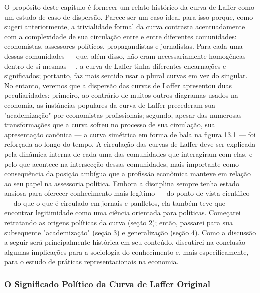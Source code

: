\documentclass[a4paper,12pt]{article}[abntex2]
\begin{document}
O propósito deste capítulo é fornecer um relato histórico da curva de Laffer como um estudo de caso de dispersão. Parece ser um caso ideal para isso porque, como sugeri anteriormente, a trivialidade formal da curva contrasta acentuadamente com a complexidade de sua circulação entre e entre diferentes comunidades: economistas, assessores políticos, propagandistas e jornalistas. Para cada uma dessas comunidades — que, além disso, não eram necessariamente homogêneas dentro de si mesmas —, a curva de Laffer tinha diferentes encarnações e significados; portanto, faz mais sentido usar o plural curvas em vez do singular. No entanto, veremos que a dispersão das curvas de Laffer apresentou duas peculiaridades: primeiro, ao contrário de muitos outros diagramas usados na economia, as instâncias populares da curva de Laffer precederam sua "academização" por economistas profissionais; segundo, apesar das numerosas transformações que a curva sofreu no processo de sua circulação, sua apresentação canônica — a curva simétrica em forma de bala na figura 13.1 — foi reforçada ao longo do tempo. A circulação das curvas de Laffer deve ser explicada pela dinâmica interna de cada uma das comunidades que interagiram com elas, e pelo que acontece na intersecção dessas comunidades, mais importante como consequência da posição ambígua que a profissão econômica manteve em relação ao seu papel na assessoria política. Embora a disciplina sempre tenha estado ansiosa para oferecer conhecimento mais legítimo — do ponto de vista científico — do que o que é circulado em jornais e panfletos, ela também teve que encontrar legitimidade como uma ciência orientada para políticas. Começarei retratando as origens políticas da curva (seção 2); então, passarei para sua subsequente "academização" (seção 3) e generalização (seção 4). Como a discussão a seguir será principalmente histórica em seu conteúdo, discutirei na conclusão algumas implicações para a sociologia do conhecimento e, mais especificamente, para o estudo de práticas representacionais na economia.

\subsubsection{\textbf{O Significado Político da Curva de Laffer Original}}
\end{document}
